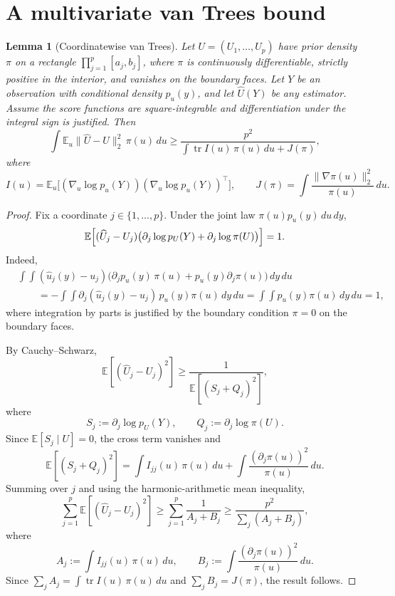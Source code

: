\documentclass[11pt]{amsart}
\newtheorem{lemma}[lemma]{Lemma}
\theoremstyle{definition}
\DeclareMathOperator{\tr}{tr}
\newcommand{\E}{\mathbb E}
\begin{document}
\section{A multivariate van Trees bound}\label{app:vantrees}

\begin{lemma}[Coordinatewise van Trees]\label{lem:vantrees}
Let $U=(U_1,\dots,U_p)$ have prior density $\pi$ on a rectangle $\prod_{j=1}^p[a_j,b_j]$, where $\pi$ is continuously differentiable, strictly positive in the interior, and vanishes on the boundary faces. Let $Y$ be an observation with conditional density $p_u(y)$, and let $\widehat U(Y)$ be any estimator. Assume the score functions are square-integrable and differentiation under the integral sign is justified. Then
\[
\int \E_u\|\widehat U-U\|_2^2\,\pi(u)\,du
\ge
\frac{p^2}{\int \tr I(u)\,\pi(u)\,du+J(\pi)},
\]
where
\[
I(u)=\E_u\bigl[(\nabla_u\log p_u(Y))(\nabla_u\log p_u(Y))^\top\bigr],
\qquad
J(\pi)=\int \frac{\|\nabla \pi(u)\|_2^2}{\pi(u)}\,du.
\]
\end{lemma}

\begin{proof}
Fix a coordinate $j\in\{1,\dots,p\}$. Under the joint law $\pi(u)p_u(y)\,du\,dy$,
\[
\E\Bigl[(\widehat U_j-U_j)\bigl(\partial_j\log p_U(Y)+\partial_j\log \pi(U)\bigr)\Bigr]=1.
\]
Indeed,
\[
\begin{aligned}
&\int \!\!\int (\widehat u_j(y)-u_j)\bigl(\partial_j p_u(y)\,\pi(u)+p_u(y)\partial_j\pi(u)\bigr)\,dy\,du\\
&\qquad = -\int \!\!\int \partial_j(\widehat u_j(y)-u_j)\,p_u(y)\pi(u)\,dy\,du
=\int\!\!\int p_u(y)\pi(u)\,dy\,du=1,
\end{aligned}
\]
where integration by parts is justified by the boundary condition $\pi=0$ on the boundary faces.

By Cauchy--Schwarz,
\[
\E[(\widehat U_j-U_j)^2]\ge \frac{1}{\E[(S_j+Q_j)^2]},
\]
where
\[
S_j:=\partial_j\log p_U(Y),\qquad Q_j:=\partial_j\log \pi(U).
\]
Since $\E[S_j\mid U]=0$, the cross term vanishes and
\[
\E[(S_j+Q_j)^2]=\int I_{jj}(u)\,\pi(u)\,du+\int \frac{(\partial_j\pi(u))^2}{\pi(u)}\,du.
\]
Summing over $j$ and using the harmonic-arithmetic mean inequality,
\[
\sum_{j=1}^p \E[(\widehat U_j-U_j)^2]
\ge \sum_{j=1}^p \frac{1}{A_j+B_j}
\ge \frac{p^2}{\sum_j(A_j+B_j)},
\]
where
\[
A_j:=\int I_{jj}(u)\,\pi(u)\,du,
\qquad
B_j:=\int \frac{(\partial_j\pi(u))^2}{\pi(u)}\,du.
\]
Since $\sum_j A_j=\int \tr I(u)\,\pi(u)\,du$ and $\sum_j B_j=J(\pi)$, the result follows.
\end{proof}
\end{document}
